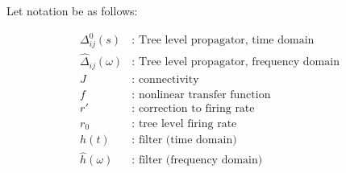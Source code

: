 \documentclass [12pt]{amsart}
\theoremstyle{definition}
\begin{document}
Let notation be as follows: 

\begin{align*}
\Delta_{ij}^0(s)&: \mbox{ Tree level propagator, time domain}\\
\hat\Delta_{ij}(\omega) &:  \mbox{ Tree level propagator, frequency domain}\\
J&: \mbox{ connectivity}\\
f&: \mbox{ nonlinear transfer function}\\
r'&: \mbox{ correction to firing rate}\\
r_0&: \mbox{ tree level firing rate}\\
h(t)&: \mbox{ filter (time domain)}\\
\hat h(\omega)&: \mbox{ filter (frequency domain)} 
\end{align*}
\end{document}
